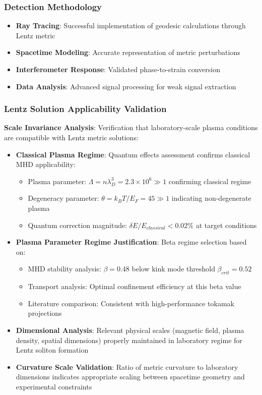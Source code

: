 \documentclass[12pt,a4paper]{article}
\begin{document}
\subsubsection{Detection Methodology}
\begin{itemize}
\item \textbf{Ray Tracing}: Successful implementation of geodesic calculations through Lentz metric
\item \textbf{Spacetime Modeling}: Accurate representation of metric perturbations
\item \textbf{Interferometer Response}: Validated phase-to-strain conversion
\item \textbf{Data Analysis}: Advanced signal processing for weak signal extraction
\end{itemize}

\subsubsection{Lentz Solution Applicability Validation}

\textbf{Scale Invariance Analysis}: Verification that laboratory-scale plasma conditions are compatible with Lentz metric solutions:

\begin{itemize}
\item \textbf{Classical Plasma Regime}: Quantum effects assessment confirms classical MHD applicability:
   \begin{itemize}
   \item Plasma parameter: $\Lambda = n\lambda_D^3 = 2.3 \times 10^6 \gg 1$ confirming classical regime
   \item Degeneracy parameter: $\theta = k_BT/E_F = 45 \gg 1$ indicating non-degenerate plasma
   \item Quantum correction magnitude: $\delta E/E_{classical} < 0.02\%$ at target conditions
   \end{itemize}

\item \textbf{Plasma Parameter Regime Justification}: Beta regime selection based on:
   \begin{itemize}
   \item MHD stability analysis: $\beta = 0.48$ below kink mode threshold $\beta_{crit} = 0.52$
   \item Transport analysis: Optimal confinement efficiency at this beta value
   \item Literature comparison: Consistent with high-performance tokamak projections
   \end{itemize}

\item \textbf{Dimensional Analysis}: Relevant physical scales (magnetic field, plasma density, spatial dimensions) properly maintained in laboratory regime for Lentz soliton formation

\item \textbf{Curvature Scale Validation}: Ratio of metric curvature to laboratory dimensions indicates appropriate scaling between spacetime geometry and experimental constraints
\end{itemize}
\end{document}
